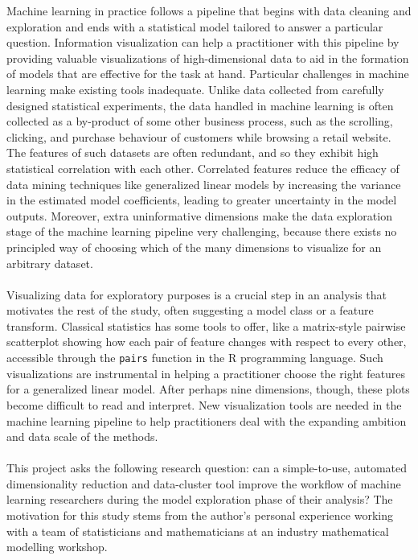\documentclass{sigchi}
\begin{document}
Machine learning in practice follows a pipeline that begins with data cleaning and exploration and ends with a statistical model tailored to answer a particular question. %
%
Information visualization can help a practitioner with this pipeline by providing valuable visualizations of high-dimensional data to aid in the formation of models that are effective for the task at hand. %
%
Particular challenges in machine learning make existing tools inadequate. %
Unlike data collected from carefully designed statistical experiments, the data handled in machine learning is often collected as a by-product of some other business process, such as the scrolling, clicking, and purchase behaviour of customers while browsing a retail website. %
The features of such datasets are often redundant, and so they exhibit high statistical correlation with each other. %
%
Correlated features reduce the efficacy of data mining techniques like generalized linear models by increasing the variance in the estimated model coefficients, leading to greater uncertainty in the model outputs. %
%
Moreover, extra uninformative dimensions make the data exploration stage of the machine learning pipeline very challenging, because there exists no principled way of choosing which of the many dimensions to visualize for an arbitrary dataset. %
%
\\\\
%
Visualizing data for exploratory purposes is a crucial step in an analysis that motivates the rest of the study, often suggesting a model class or a feature transform. %
%
Classical statistics has some tools to offer, like a matrix-style pairwise scatterplot showing how each pair of feature changes with respect to every other, accessible through the \texttt{pairs} function in the R programming language. %
%
Such visualizations are instrumental in helping a practitioner choose the right features for a generalized linear model. %
%
After perhaps nine dimensions, though, these plots become difficult to read and interpret. %
New visualization tools are needed in the machine learning pipeline to help practitioners deal with the expanding ambition and data scale of the methods. %
%
\\\\
%
This project asks the following research question: can a simple-to-use, automated dimensionality reduction and data-cluster tool improve the workflow of machine learning researchers during the model exploration phase of their analysis? %
%
The motivation for this study stems from the author's personal experience working with a team of statisticians and mathematicians at an industry mathematical modelling workshop. %
\end{document}
